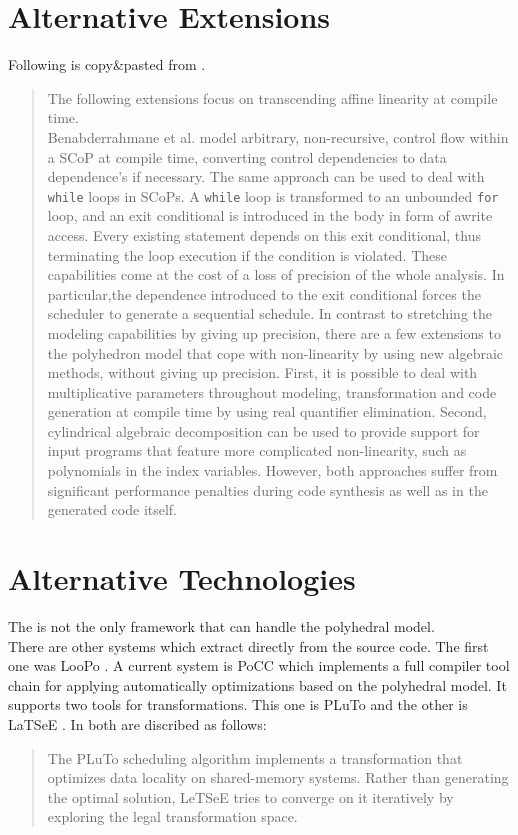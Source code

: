 \section[Alternative Extensions]{Alternative Extensions \cite{PolyhedralEmpiricalStudy}}\label{sec:altExt}
Following is copy\&pasted from \cite{PolyhedralEmpiricalStudy}.
\begin{quotation}
The following extensions focus on transcending affine linearity at compile time.\\
Benabderrahmane et al. model arbitrary, non-recursive, control flow within a SCoP at compile time, converting control dependencies to data dependence's if necessary.
The same approach can be used to deal with \texttt{while} loops in SCoPs.
A \texttt{while} loop is transformed to an unbounded \texttt{for} loop, and an exit conditional is introduced in the body in form of awrite access.
Every existing statement depends on this exit conditional, thus terminating the loop execution if the condition is violated.
These capabilities come at the cost of a loss of precision of the whole analysis.
In particular,the dependence introduced to the exit conditional forces the scheduler to generate a sequential schedule.
In contrast to stretching the modeling capabilities by giving up precision, there are a few extensions to the polyhedron model that cope with non-linearity by using new algebraic methods, without giving up precision.
First, it is possible to deal with multiplicative parameters throughout modeling, transformation and code generation at compile time by using real quantifier elimination.
Second, cylindrical algebraic decomposition can be used to provide support for input programs that feature more complicated non-linearity, such as polynomials in the index variables.
However, both approaches suffer from significant performance penalties during code synthesis as well as in the generated code itself.
\end{quotation}

\section[Alternative Technologies]{Alternative Technologies \cite{PolyhedralEmpiricalStudy}}
The \llvm is not the only framework that can handle the polyhedral model.\\
There are other systems which extract \scops directly from the source code.
The first one was LooPo \cite{loopo}.
A current system is PoCC \cite{pocc} which implements a full compiler tool chain for applying automatically optimizations based on the polyhedral model.
It supports two tools for transformations.
This one is PLuTo \cite{pluto} and the other is LaTSeE \cite{latsee}.
In \cite{PolyhedralEmpiricalStudy} both are discribed as follows:
\begin{quotation}
    The PLuTo scheduling algorithm implements a transformation that optimizes data locality on shared-memory systems.
    Rather than generating the optimal solution, LeTSeE tries to converge on it iteratively by exploring the legal transformation space.
\end{quotation}

